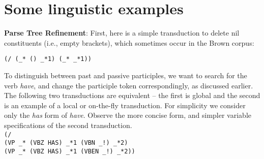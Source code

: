 \documentclass[a4,11pt]{article}
\begin{document}

\section{Some linguistic examples}
{\bf Parse Tree Refinement}:
First, here is a simple transduction to delete nil constituents (i.e., empty brackets), which sometimes occur in the Brown corpus:

\texttt{(/ (\_* () \_*1) (\_* \_*1))}

To distinguish between past and passive participles, we want to search for the verb {\it have}, and change the participle token correspondingly, as discussed earlier.  The following two transductions are equivalent -- the first is global and the second is an example of a local or on-the-fly transduction. For simplicity we consider only the {\it has} form of {\it have}.  Observe the more concise form, and simpler variable specifications of the second transduction.\\
\footnotesize
\hspace*{0.5em} \texttt{(/} \\
\hspace*{1.4em} \texttt{(VP \_* (VBZ HAS) \_*1 (VBN \_!) \_*2)}\\
\hspace*{1.40em} \texttt{(VP \_* (VBZ HAS) \_*1 (VBEN \_!) \_*2))}\\
\end{document}

